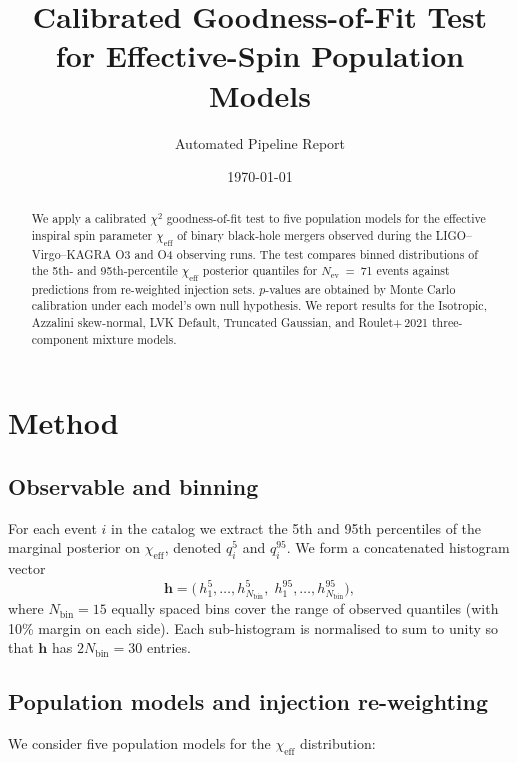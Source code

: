 \documentclass[11pt,a4paper]{article}
\title{Calibrated Goodness-of-Fit Test for Effective-Spin Population Models}
\author{Automated Pipeline Report}
\date{\today}
\newcommand{\chieff}{\ensuremath{\chi_\mathrm{eff}}\xspace}
\newcommand{\Nev}{\ensuremath{N_\mathrm{ev}}\xspace}
\newcommand{\Nbin}{\ensuremath{N_\mathrm{bin}}\xspace}
\begin{document}
\maketitle

\begin{abstract}
We apply a calibrated $\chi^2$ goodness-of-fit test to five population models
for the effective inspiral spin parameter \chieff of binary black-hole mergers
observed during the LIGO--Virgo--KAGRA O3 and O4 observing runs.  The test
compares binned distributions of the 5th- and 95th-percentile \chieff
posterior quantiles for \Nev~=~71 events against predictions from
re-weighted injection sets.  $p$-values are obtained by Monte Carlo
calibration under each model's own null hypothesis.  We report results for the
Isotropic, Azzalini skew-normal, LVK Default, Truncated Gaussian, and
Roulet+\,2021 three-component mixture models.
\end{abstract}

\section{Method}\label{sec:method}

\subsection{Observable and binning}

For each event $i$ in the catalog we extract the 5th and 95th percentiles of
the marginal posterior on \chieff, denoted $q_i^{5}$ and $q_i^{95}$.  We
form a concatenated histogram vector
\begin{equation}
  \mathbf{h} = \bigl(\,h_1^{5},\dots,h_{\Nbin}^{5},\;
                      h_1^{95},\dots,h_{\Nbin}^{95}\bigr),
\end{equation}
where $\Nbin = 15$ equally spaced bins cover the range of observed quantiles
(with 10\% margin on each side).  Each sub-histogram is normalised to sum to
unity so that $\mathbf{h}$ has $2\Nbin = 30$ entries.

\subsection{Population models and injection re-weighting}

We consider five population models for the \chieff distribution:
\end{document}

